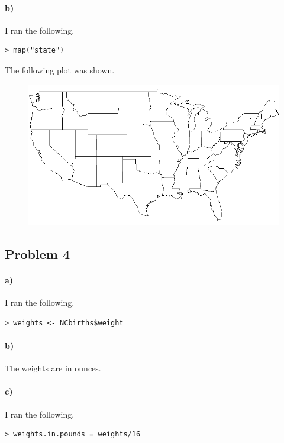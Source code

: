\documentclass[12pt]{article}
\begin{document}
\paragraph{b)}

I ran the following.
\begin{verbatim}
> map("state")
\end{verbatim}
The following plot was shown.
\begin{figure}[H]
    \begin{center}
        \includegraphics[width=4.5in]{section1problem3b.png}
    \end{center}
\end{figure}

\subsection*{Problem 4}

\paragraph{a)}

I ran the following.
\begin{verbatim}
> weights <- NCbirths$weight
\end{verbatim}

\paragraph{b)}

The weights are in ounces.

\paragraph{c)}

I ran the following.
\begin{verbatim}
> weights.in.pounds = weights/16
\end{verbatim}
\end{document}
